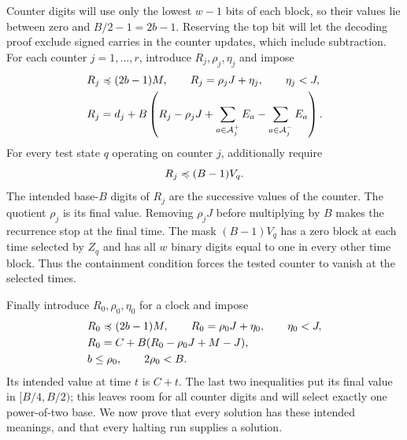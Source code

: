 Counter digits will use only the lowest $w-1$ bits of each block,
so their values lie between zero and $B/2-1=2b-1$.
Reserving the top bit will let the decoding proof exclude signed
carries in the counter updates, which include subtraction.
For each counter $j=1,\ldots,r$, introduce $R_j,\rho_j,\eta_j$ and impose
\begin{align}
 &R_j\preccurlyeq (2b-1)M,\qquad R_j=\rho_jJ+\eta_j,
       \qquad\eta_j<J,\label{eq:machine-counter-bound}\\
 &R_j=d_j+B\left(R_j-\rho_jJ+
       \sum_{a\in\mathcal A_j^+}E_a-
       \sum_{a\in\mathcal A_j^-}E_a\right).
       \label{eq:machine-counter-transition}
\end{align}
For every test state $q$ operating on counter $j$, additionally require
\begin{equation}\label{eq:machine-zero-test}
 R_j\preccurlyeq (B-1)V_q.
\end{equation}
The intended base-$B$ digits of $R_j$ are the successive values of the
counter. The quotient $\rho_j$ is its final value. Removing $\rho_jJ$
before multiplying by $B$ makes the recurrence stop at the final time.
The mask $(B-1)V_q$ has a zero block at each time selected by $Z_q$
and has all $w$ binary digits equal to one in every other time block.
Thus the containment condition forces the tested counter to vanish at
the selected times.

Finally introduce $R_0,\rho_0,\eta_0$ for a clock and impose
\begin{align}
 &R_0\preccurlyeq(2b-1)M,\qquad R_0=\rho_0J+\eta_0,
       \qquad\eta_0<J,\label{eq:machine-clock-bound}\\
 &R_0=C+B(R_0-\rho_0J+M-J),\label{eq:machine-clock-update}\\
 &b\leq\rho_0,\qquad 2\rho_0<B.\label{eq:machine-clock-scale}
\end{align}
Its intended value at time $t$ is $C+t$. The last two inequalities put
its final value in $[B/4,B/2)$; this leaves room for all counter digits
and will select exactly one power-of-two base. We now prove that every
solution has these intended meanings, and that every halting run supplies
a solution.

